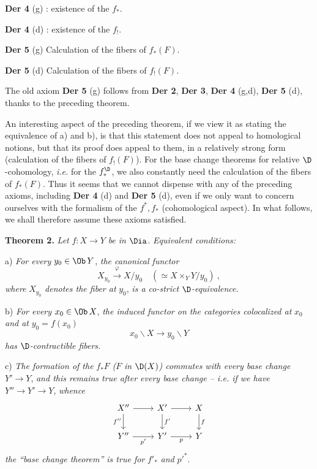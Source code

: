 
\noindent\textbf{Der 4} (g) : existence of the $f_*$.

\noindent\textbf{Der 4} (d) : existence of the $f_!$.

\noindent\textbf{Der 5} (g) Calculation of the fibers of $f_*(F)$.

\noindent\textbf{Der 5} (d) Calculation of the fibers of $f_!(F)$.

\noindent The old axiom \textbf{Der 5} (g) follows from \textbf{Der 2}, \textbf{Der 3}, \textbf{Der 4} (g,d), \textbf{Der 5} (d), thanks to the preceding theorem.

An interesting aspect of the preceding theorem, if we view it as stating the equivalence of a) and b), is that this statement does not appeal to homological notions, but that its proof does appeal to them, in a relatively strong form (calculation of the fibers of $f_!(F)$). For the base change theorems for relative $\D$-cohomology, \textit{i.e.} for the $f_*^{\D}$, we also constantly need the calculation of the fibers of $f_*(F)$. Thus it seems that we cannot dispense with any of the preceding axioms, including \textbf{Der 4} (d) and \textbf{Der 5} (d), even if we only want to concern ourselves with the formalism of the $f^*, f_*$ (cohomological aspect). In what follows, we shall therefore assume these axioms satisfied.

\noindent\textbf{Theorem 2.} \textit{Let} $f : X \to Y$ \textit{be in} $\Dia$. \textit{Equivalent conditions:}

a) \textit{For every} $y_0 \in \Ob\, Y$, \textit{the canonical functor}
\[
X_{y_0} \overset{\varphi}{\longrightarrow} X/y_0 \quad (\simeq X \times_Y Y/y_0) \ ,
\]
\textit{where} $X_{y_0}$ \textit{denotes the fiber at} $y_0$, \textit{is a co-strict} $\D$\textit{-equivalence.}

b) \textit{For every} $x_0 \in \Ob\, X$, \textit{the induced functor on the categories colocalized at} $x_0$ \textit{and at} $y_0 = f(x_0)$
\[
x_0\backslash X \longrightarrow y_0\backslash Y
\]
\textit{has} $\D$\textit{-contractible fibers.}


c) \textit{The formation of the} $f_*F$ \textit{(}$F$ \textit{in} $\D(X)$\textit{) commutes with every base change} $Y' \to Y$, \textit{and this remains true after every base change -- i.e. if we have} $Y'' \to Y' \to Y$, \textit{whence}
\[
\begin{tikzcd}
X'' \arrow[r] \arrow[d, "f''"{swap}] & X' \arrow[r] \arrow[d, "f'"] & X \arrow[d, "f"] \\
Y'' \arrow[r, "p'"{swap}] & Y' \arrow[r, "p"{swap}] & Y
\end{tikzcd}
\]
\textit{the ``base change theorem'' is true for} $f'_*$ \textit{and} $p'^{*}$.

